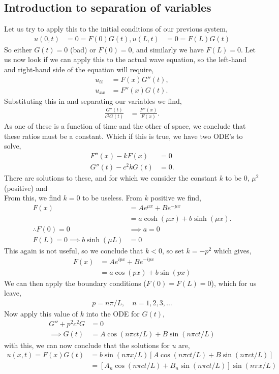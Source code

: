 \documentclass[11pt,a4paper]{report}
\theoremstyle{definition}
\begin{document}
\subsection{Introduction to separation of variables}
Let us try to apply this to the initial conditions of our previous system,
\begin{align*}
	u(0,t) &= 0 = F(0) G(t),
	u(L,t) &= 0 = F(L) G(t)
\end{align*}
So either $G(t)=0$ (bad) or $F(0)=0$, and similarly we have $F(L)=0$. Let us now look if we can apply this to the actual wave equation, so the left-hand and right-hand side of the equation will require,
\begin{align*}
	u_{tt} &= F(x) G''(t),\\
	u_{xx} &= F''(x) G(t). 
\end{align*}
Substituting this in and separating our variables we find,
\begin{align*}
	\frac{G''(t)}{c^2 G(t)} &= \frac{F''(x)}{F(x)}.
\end{align*}
As one of these is a function of time and the other of space, we conclude that these ratios must be a constant. Which if this is true, we have two ODE's to solve,
\begin{align*}
	F''(x) - kF(x) &= 0 \\
	G''(t) - c^2k G(t) &= 0.
\end{align*}
There are solutions to these, and for which we consider the constant $k$ to be $0$, $\mu^2$ (positive) and \\

From this, we find $k=0$ to be useless. From $k$ positive we find,
\begin{align*}
	F(x)&= Ae^{\mu x} + Be^{-\mu x}\\
	    &= a \cosh (\mu x) + b \sinh (\mu x). \\
\therefore F(0) = 0 &\implies a = 0 \\
F(L) = 0 \implies b\sinh(\mu L) &= 0
\end{align*}
This again is not useful, so we conclude that $k<0$, so set $k=-p^2$ which gives,
\begin{align*}
	F(x)&= Ae^{ipx} + Be^{-ipx} \\
		&= a\cos(px) + b\sin(px)
\end{align*}
We can then apply the boundary conditions ($F(0)=F(L)=0$), which for us leave,
\begin{align*}
	p = n\pi / L, \quad n=1,2,3,\dots
\end{align*}
Now apply this value of $k$ into the ODE for $G(t)$,
\begin{align*}
	G'' + p^2 c^2 G &= 0 \\
	\implies G(t) &= A \cos(n\pi c t/L) + B \sin(n\pi ct/L)
\end{align*}
with this, we can now conclude that the solutions for $u$ are,
\begin{align*}
 u(x,t) = F(x)G(t) &= b\sin(n\pi x/L) [A \cos(n\pi c t/L) + B \sin(n\pi ct/L)] \\
 				   &= [A_n \cos(n\pi c t/L) + B_n \sin(n\pi ct/L)] \sin(n\pi x/L)
\end{align*}
\end{document}
